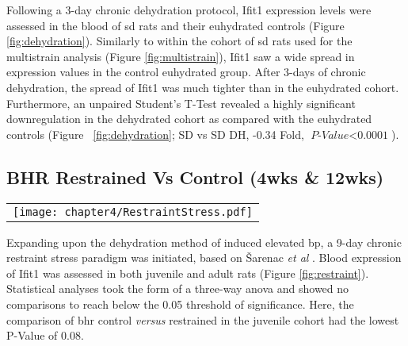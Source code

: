 Following a 3-day chronic dehydration protocol, Ifit1 expression levels were assessed in the blood of \acrshort{sd} rats and their euhydrated controls (Figure \ref{fig:dehydration}). Similarly to within the cohort of \acrshort{sd} rats used for the multistrain analysis (Figure \ref{fig:multistrain}), Ifit1 saw a wide spread in expression values in the control euhydrated group. After 3-days of chronic dehydration, the spread of Ifit1 was much tighter than in the euhydrated cohort. Furthermore, an unpaired Student's T-Test revealed a highly significant downregulation in the dehydrated cohort as compared with the euhydrated controls (Figure ~\ref{fig:dehydration}; SD vs SD DH, -0.34 Fold, $\textit{P-Value$<$0.0001}$). 

\subsection{BHR Restrained Vs Control (4wks \& 12wks)}

\begin{figure*}
\centering
\begin{tabular}{c}
  \texttt{[image: chapter4/RestraintStress.pdf]} \\
\end{tabular}
\caption[Restraint stress paradigm of induced hypertension]{Restraint stress paradigm of induced hypertension, using genetically predisposed \acrfull{bhr} against their Wistar controls. Both juvenile (4-weeks) and adult (12-weeks), were subjected to a 9-day chronic restraint stress paradigm or remained as unrestrained controls. Displayed here are $2^{-\Delta\Delta C_{T}}$ of Ifit1 normalised to $\beta$-Actin and control juvenile Wistar Ifit1 expression. Statistical analysis made use of three-way \acrfull{anova} with Tukey's multiple test correction. (P-Value $<$0.05, *; $<$0.01, **; $<$0.001, ***).}
\label{fig:restraint}
\end{figure*}

Expanding upon the dehydration method of induced elevated \acrshort{bp}, a 9-day chronic restraint stress paradigm was initiated, based on Šarenac \textit{et al} \cite{Sarenac2011}. Blood expression of Ifit1 was assessed in both juvenile and adult rats (Figure \ref{fig:restraint}). Statistical analyses took the form of a three-way \acrshort{anova} and showed no comparisons to reach below the 0.05 threshold of significance. Here, the comparison of \acrshort{bhr} control \textit{versus} restrained in the juvenile cohort had the lowest P-Value of 0.08. 

